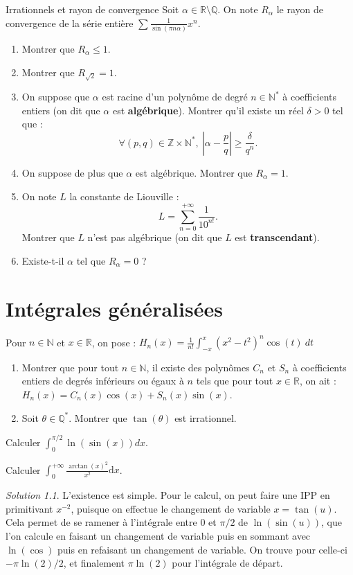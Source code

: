 \documentclass[french]{book}
\newcommand{\N}{\mathbb{N}}
\newcommand{\Z}{\mathbb{Z}}
\newcommand{\Q}{\mathbb{Q}}
\newcommand{\R}{\mathbb{R}}
\newcommand{\st}{^*}
\theoremstyle{definition}
\theoremstyle{remark}
\newtheorem*{sol}{Solution}
\begin{document}
\begin{exo}[3]{Irrationnels et rayon de convergence}
	Soit $\alpha\in\R\setminus\Q$. On note $R_\alpha$ le rayon de convergence de la série entière $\displaystyle\sum \frac{1}{\sin(\pi n\alpha)}x^n$.
	\begin{enumerate}
		\item Montrer que $R_\alpha\leqslant 1$.
		\item Montrer que $R_{\sqrt{2}}=1$.
		\item On suppose que $\alpha$ est racine d'un polynôme de degré $n\in\N\st$ à coefficients entiers (on dit que $\alpha$ est \textbf{algébrique}). Montrer qu'il existe un réel $\delta>0$ tel que :
		$$\forall (p,q)\in\Z\times\N\st,\ \left\lvert\alpha-\frac{p}{q}\right\rvert\geqslant\frac{\delta}{q^n}.$$
		\item On suppose de plus que $\alpha$ est algébrique. Montrer que $R_\alpha=1$.
		\item On note $L$ la constante de Liouville :
		$$L=\sum_{n=0}^{+\infty}\frac{1}{10^{n!}}.$$
		Montrer que $L$ n'est pas algébrique (on dit que $L$ est \textbf{transcendant}).
		\item Existe-t-il $\alpha$ tel que $R_\alpha=0$ ?
	\end{enumerate}
\end{exo}


\chapter{Intégrales généralisées}

\begin{exo}[1]{}
	Pour $n\in\N$ et $x\in\R$, on pose : $H_n(x)=\displaystyle\frac{1}{n!}\int_{-x}^{x}(x^2-t^2)^n\cos(t)\ dt$
	\begin{enumerate}
		\item Montrer que pour tout $n\in\N$, il existe des polynômes $C_n$ et $S_n$ à coefficients entiers de degrés inférieurs ou égaux à $n$ tels que pour tout $x\in\R$, on ait : $H_n(x)=C_n(x)\cos(x)+S_n(x)\sin(x)$.
		\item Soit $\theta\in\Q\st$. Montrer que $\tan(\theta)$ est irrationnel.
	\end{enumerate}
\end{exo}

\begin{exo}[2]{}
	Calculer $\displaystyle\int_{0}^{\pi/2}\ln(\sin(x))dx$.
\end{exo}

\begin{exo}[3]{}
	Calculer $\displaystyle\int_{0}^{+\infty}\frac{\arctan(x)^2}{x^2}\text{d}x$.
\end{exo}
\begin{sol}
	L'existence est simple. Pour le calcul, on peut faire une IPP en primitivant $x^{-2}$, puisque on effectue le changement de variable $x=\tan(u)$. Cela permet de se ramener à l'intégrale entre $0$ et $\pi/2$ de $\ln(\sin(u))$, que l'on calcule en faisant un changement de variable puis en sommant avec $\ln(\cos)$ puis en refaisant un changement de variable. On trouve pour celle-ci $-\pi\ln(2)/2$, et finalement $\pi\ln(2)$ pour l'intégrale de départ.
\end{sol}
\end{document}
